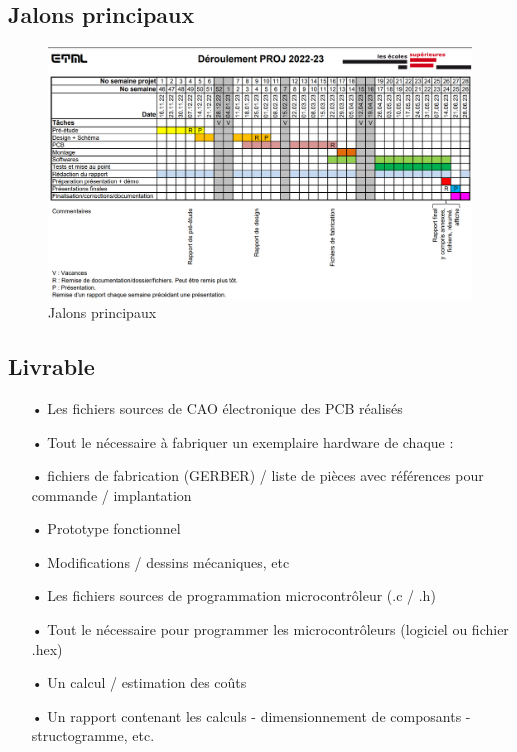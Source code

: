 \subsection{Jalons principaux}
\begin{figure}[h!]
    \centering
    \includegraphics[width=.9\textwidth,center,]{../CDC/Figures/Tab-Jalons-PROJ.PNG}
    \caption{Jalons principaux}
    \label{fig:Jalons}
\end{figure}

\subsection{Livrable}
\begin{itemize}
    \item[•] Les fichiers sources de CAO électronique des PCB réalisés
    \item[•] Tout le nécessaire à fabriquer un exemplaire hardware de chaque :
    \item[•] fichiers de fabrication (GERBER) / liste de pièces avec références pour commande / implantation
    \item[•] Prototype fonctionnel
    \item[•] Modifications / dessins mécaniques, etc
    \item[•] Les fichiers sources de programmation microcontrôleur (.c  / .h)
    \item[•] Tout le nécessaire pour programmer les microcontrôleurs (logiciel ou fichier .hex)
    \item[•] Un calcul / estimation des coûts
    \item[•] Un rapport contenant les calculs - dimensionnement de composants - structogramme, etc.
\end{itemize}

\clearpage
